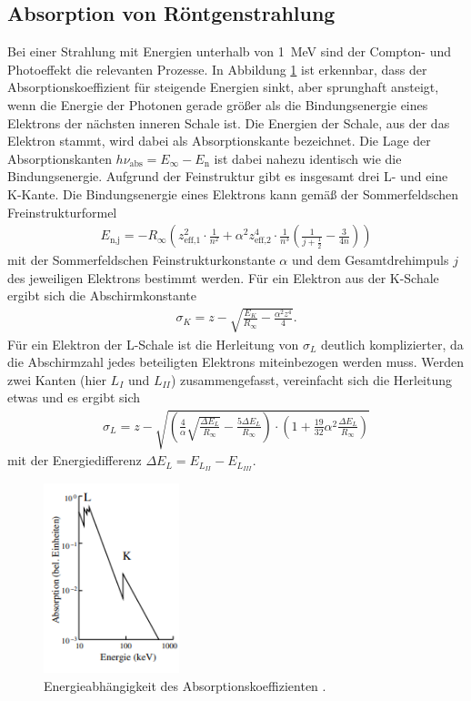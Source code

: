 \subsection{Absorption von Röntgenstrahlung}
Bei einer Strahlung mit Energien unterhalb von \qty[]{1}{\mega\electronvolt} sind der Compton- und Photoeffekt die relevanten Prozesse.
In Abbildung \ref{fig:absorption} ist erkennbar, dass der Absorptionskoeffizient für steigende Energien sinkt, aber sprunghaft ansteigt, wenn die Energie der 
Photonen gerade größer als die Bindungsenergie eines Elektrons der nächsten inneren Schale ist.
Die Energien der Schale, aus der das Elektron stammt, wird dabei als Absorptionskante bezeichnet.
Die Lage der Absorptionskanten  $h \nu_\text{abs} = E_\infty - E_\text{n}$ ist dabei nahezu identisch wie die Bindungsenergie.
Aufgrund der Feinstruktur gibt es insgesamt drei L- und eine K-Kante.
Die Bindungsenergie eines Elektrons kann gemäß der Sommerfeldschen Freinstrukturformel 
\begin{align}
    E_\text{n,j} = -R_\infty \left(z_\text{eff,1}^2 \cdot \frac{1}{n^2} + \alpha^2 z_\text{eff,2}^4 \cdot \frac{1}{n^3} \left(\frac{1}{j + \frac{1}{2}} - \frac{3}{4n}\right)\right)
    \label{eq:sommerfeld}
\end{align} 
mit der Sommerfeldschen Feinstrukturkonstante $\alpha$ und dem Gesamtdrehimpuls $j$ des jeweiligen Elektrons bestimmt werden.
Für ein Elektron aus der K-Schale ergibt sich die Abschirmkonstante
\begin{align}
    \sigma_K = z - \sqrt{\frac{E_K}{R_\infty} - \frac{\alpha^2 z^4}{4}}.
    \label{eq:abschirmung_k}
\end{align}
Für ein Elektron der L-Schale ist die Herleitung von $\sigma_L$ deutlich komplizierter, da die Abschirmzahl jedes beteiligten Elektrons miteinbezogen werden muss.
Werden zwei Kanten (hier $L_I$ und $L_{II}$) zusammengefasst, vereinfacht sich die Herleitung etwas und es ergibt sich
\begin{align}
    \sigma_L = z - \sqrt{\left(\frac{4}{\alpha}\sqrt{\frac{\Delta E_L}{R_\infty}} - \frac{5 \Delta E_L}{R_\infty}\right)
    \cdot \left(1 + \frac{19}{32} \alpha^2 \frac{\Delta E_L}{R_\infty}\right)}
    \label{eq:abschirmung_l}
\end{align}
mit der Energiedifferenz $\Delta E_L = E_{L_{II}} - E_{L_{III}}$.


\begin{figure}[H]
    \centering
    \includegraphics[height= 5.5cm]{Abbildungen/absorption.png}
    \caption[]{Energieabhängigkeit des Absorptionskoeffizienten \cite[]{man:v602}.}
    \label{fig:absorption}
\end{figure}




